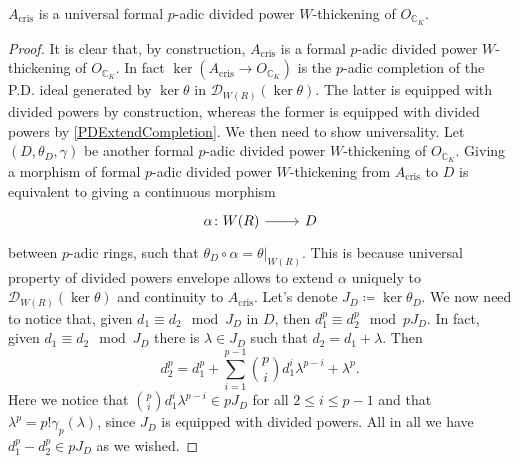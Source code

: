 \begin{prop}\label{UPACris}
	$A_{\mathrm{cris}}$ is a universal formal $p$-adic divided power $W$-thickening of
	$O_{\mathbb{C}_K}$.
\end{prop}
\begin{proof}
	It is clear that, by construction, $A_{\mathrm{cris}}$ is a
	formal $p$-adic divided power $W$-thickening of $O_{\mathbb{C}_K}$.
	In fact $\ker (A_{\mathrm{cris}} \to O_{\mathbb{C}_K})$
	is the $p$-adic completion of the P.D. ideal generated by $\ker \theta$
	in $\mathcal{D}_{W(R)}(\ker\theta)$.
	The latter is equipped with divided powers by construction, whereas
	the former is equipped with divided powers by \cref{PDExtendCompletion}.
	We then need to show universality.
	Let $\left(D, \theta_D, \gamma\right)$ be another formal $p$-adic divided power
	$W$-thickening of $O_{\mathbb{C}_K}$.
	Giving a morphism of formal $p$-adic divided power $W$-thickening
	from $A_{\mathrm{cris}}$ to $D$ is equivalent to giving
	a continuous morphism
	\begin{equation*}
	\begin{tikzcd}[row sep = 0ex
		,/tikz/column 1/.append style={anchor=base east}
		,/tikz/column 2/.append style={anchor=base west}]
		\alpha\colon W(R) \arrow[r, "", rightarrow] &
		D
	\end{tikzcd}
	\end{equation*} 
	between $p$-adic rings, such that $\theta_D \circ \alpha = \left.\theta\right|_{ W(R) }$.
	This is because universal property of divided powers envelope
	allows to extend $\alpha$ uniquely to $\mathcal{D}_{W(R)}(\ker\theta)$
	and continuity to $A_{\mathrm{cris}}$.
	Let's denote $J_D \coloneqq \ker\theta_D$.
	We now need to notice that, given $d_1 \equiv d_2 \mod J_D$ in $D$,
	then $d_1^p \equiv d_2^p \mod pJ_D$.
	In fact, given $d_1 \equiv d_2 \mod J_D$ there is $\lambda \in J_D$
	such that $d_2 = d_1 + \lambda$.
	Then
	\begin{equation*}
		d_2^p = d_1^p + \sum_{i=1}^{ p-1 } \binom{p}{i} d_1^i \lambda^{p-i} + \lambda^p
	.\end{equation*}
	Here we notice that $\binom{p}{i} d_1^i \lambda^{p-i} \in pJ_D$ for all $2 \leq i \leq p-1$
	and that $\lambda^p = p! \gamma_p(\lambda)$, since $J_D$ is equipped with divided
	powers.
	All in all we have $d_1^p - d_2^p \in pJ_D$ as we wished.

\end{proof}
